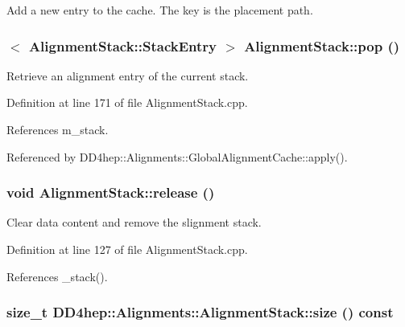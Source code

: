 Add a new entry to the cache. The key is the placement path. \hypertarget{class_d_d4hep_1_1_alignments_1_1_alignment_stack_aa140239531cbb98a7dde1d8af1f69877}{
\subsubsection[{pop}]{$<$ {\bf AlignmentStack::StackEntry} $>$ AlignmentStack::pop ()}}
\label{class_d_d4hep_1_1_alignments_1_1_alignment_stack_aa140239531cbb98a7dde1d8af1f69877}


Retrieve an alignment entry of the current stack. 

Definition at line 171 of file AlignmentStack.cpp.

References m\_\-stack.

Referenced by DD4hep::Alignments::GlobalAlignmentCache::apply().\hypertarget{class_d_d4hep_1_1_alignments_1_1_alignment_stack_aaf6353204aae5bda656bdda70d1161aa}{
\subsubsection[{release}]{\setlength{\rightskip}{0pt plus 5cm}void AlignmentStack::release ()}}
\label{class_d_d4hep_1_1_alignments_1_1_alignment_stack_aaf6353204aae5bda656bdda70d1161aa}


Clear data content and remove the slignment stack. 

Definition at line 127 of file AlignmentStack.cpp.

References \_\-stack().\hypertarget{class_d_d4hep_1_1_alignments_1_1_alignment_stack_af852a095659b263e9a7e2a10b04e0854}{
\subsubsection[{size}]{\setlength{\rightskip}{0pt plus 5cm}size\_\-t DD4hep::Alignments::AlignmentStack::size () const}}
\label{class_d_d4hep_1_1_alignments_1_1_alignment_stack_af852a095659b263e9a7e2a10b04e0854}


